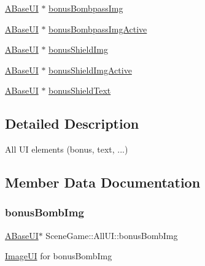 \begin{DoxyCompactItemize}
\item 
\hyperlink{class_a_base_u_i}{A\+Base\+UI} $\ast$ \hyperlink{struct_scene_game_1_1_all_u_i_a57ebcb90b637c7d58060c88cdd23dcba}{bonus\+Bombpass\+Img}
\item 
\hyperlink{class_a_base_u_i}{A\+Base\+UI} $\ast$ \hyperlink{struct_scene_game_1_1_all_u_i_a8c129b110caed5de085d3baec70df177}{bonus\+Bombpass\+Img\+Active}
\item 
\hyperlink{class_a_base_u_i}{A\+Base\+UI} $\ast$ \hyperlink{struct_scene_game_1_1_all_u_i_ad84ac22929c112bf962c4d9eb9ca9f70}{bonus\+Shield\+Img}
\item 
\hyperlink{class_a_base_u_i}{A\+Base\+UI} $\ast$ \hyperlink{struct_scene_game_1_1_all_u_i_a4706b9246bc15639b59e1f22c33d1111}{bonus\+Shield\+Img\+Active}
\item 
\hyperlink{class_a_base_u_i}{A\+Base\+UI} $\ast$ \hyperlink{struct_scene_game_1_1_all_u_i_a7b0f9dc70f91ee7f4be3c6ec652baf68}{bonus\+Shield\+Text}
\end{DoxyCompactItemize}


\subsection{Detailed Description}
All UI elements (bonus, text, ...) 

\subsection{Member Data Documentation}
\mbox{\label{struct_scene_game_1_1_all_u_i_a9aa14511898a0fe3cbf9a031d59bb634}} 
\subsubsection{\texorpdfstring{bonus\+Bomb\+Img}{bonusBombImg}}
{\footnotesize\ttfamily \hyperlink{class_a_base_u_i}{A\+Base\+UI}$\ast$ Scene\+Game\+::\+All\+U\+I\+::bonus\+Bomb\+Img}

\hyperlink{class_image_u_i}{Image\+UI} for bonus\+Bomb\+Img \mbox{\label{struct_scene_game_1_1_all_u_i_a2252e9123bcecbb0929ba648d6a29092}} 
